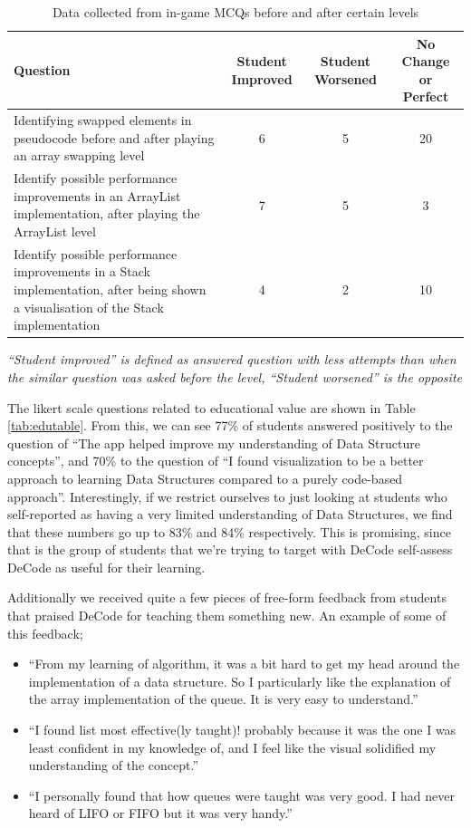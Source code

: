 \documentclass[10pt]{article}
\begin{document}
\begin{table}[]
  \begin{tabulary}{\linewidth}{|L|C|C|C|}
  \hline
  \textbf{Question}                                                                                                                   & \textbf{Student Improved} & \textbf{Student Worsened} & \textbf{No Change or Perfect} \\ \hline
  Identifying swapped elements in pseudocode before and after playing an array swapping level                                         & 6                         & 5                         & 20                         \\ \hline
  Identify possible performance improvements in an ArrayList implementation, after playing the ArrayList level                        & 7                         & 5                         & 3                          \\ \hline
  Identify possible performance improvements in a Stack implementation, after being shown a visualisation of the Stack implementation & 4                         & 2                         & 10                         \\ \hline
   \end{tabulary}
   \emph{``Student improved'' is defined as answered question with less attempts than when the similar question was asked before the level, ``Student worsened'' is the opposite}
  \caption{Data collected from in-game MCQs before and after certain levels}
  \label{tab:edudatatable}
\end{table}
The likert scale questions related to educational value are shown in Table \ref{tab:edutable}. From this, we can see 77\% of students answered positively to the question of ``The app helped improve my understanding of Data Structure concepts'', and 70\% to the question of ``I found visualization to be a better approach to learning Data Structures compared to a purely code-based approach''. Interestingly, if we restrict ourselves to just looking at students who self-reported as having a very limited understanding of Data Structures, we find that these numbers go up to 83\% and 84\% respectively. This is promising, since that is the group of students that we're trying to target with DeCode self-assess DeCode as useful for their learning.\par
Additionally we received quite a few pieces of free-form feedback from students that praised DeCode for teaching them something new. An example of some of this feedback;
\begin{itemize}
  \item ``From my learning of algorithm, it was a bit hard to get my head around the implementation of a data structure. So I particularly like the explanation of the array implementation of the queue. It is very easy to understand.''
  \item ``I found list most effective(ly taught)! probably because it was the one I was least confident in my knowledge of, and I feel like the visual solidified my understanding of the concept.''
  \item ``I personally found that how queues were taught was very good. I had never heard of LIFO or FIFO but it was very handy.''
\end{itemize}
\end{document}

